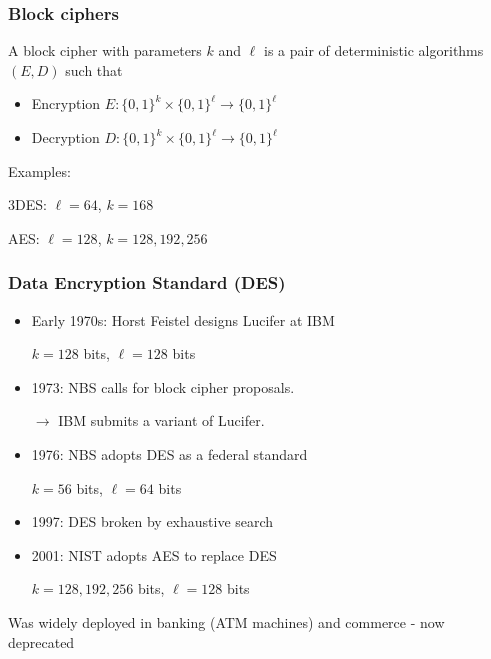\documentclass[aspectratio=169, lualatex, handout, 10pt,dvipsnames,svgnames]{beamer} %
\def\envert#1{\textcolor{vert}{#1}}
\begin{document}
\begin{frame}
  
  \frametitle{Block ciphers}

  A block cipher with parameters $k$ and $\ell$ is a pair of deterministic algorithms $(E, D)$ such that
  \begin{itemize}
  \item Encryption $E: \{0, 1\}^k \times \{0, 1\}^\ell \rightarrow \{0, 1\}^\ell$
  \item Decryption $D: \{0, 1\}^k \times \{0, 1\}^\ell \rightarrow \{0, 1\}^\ell$
  \end{itemize}
  \bigskip{}

  \envert{Examples:}

  \hspace{1cm}\envert{3DES: $\ell=64$, $k=168$}

  \hspace{1cm}\envert{AES: $\ell=128$, $k=128, 192, 256$}
\end{frame}

\begin{frame}

  \frametitle{Data Encryption Standard (DES)}

  \begin{itemize}

  \item Early 1970s: Horst Feistel designs Lucifer at IBM 
  
  $k = 128$ bits, $\ell = 128$ bits 
  \bigskip{}

  \item 1973: NBS calls for block cipher proposals. 

    $\longrightarrow$ IBM submits a variant of Lucifer.  
  \bigskip{}
 
  \item 1976: NBS adopts DES as a federal standard 

    $k = 56$ bits, $\ell = 64$ bits
    \bigskip{}
    
  \item 1997: DES broken by exhaustive search
    \bigskip{}
    
  \item 2001: NIST adopts AES to replace DES

    $k = 128, 192, 256$ bits, $\ell = 128$ bits
  \end{itemize}
  \bigskip{}

  Was widely deployed in banking (ATM machines) and commerce - now deprecated

\end{frame}
\end{document}
